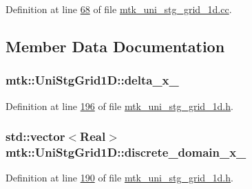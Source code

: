 Definition at line \hyperlink{mtk__uni__stg__grid__1d_8cc_source_l00068}{68} of file \hyperlink{mtk__uni__stg__grid__1d_8cc_source}{mtk\+\_\+uni\+\_\+stg\+\_\+grid\+\_\+1d.\+cc}.



\subsection{Member Data Documentation}
\hypertarget{classmtk_1_1UniStgGrid1D_a12577bbe0b88e9a0ac9b2267f2fcc48c}{
\subsubsection[{delta\+\_\+x\+\_\+}]{ mtk\+::\+Uni\+Stg\+Grid1\+D\+::delta\+\_\+x\+\_\+\hspace{0.3cm}{\ttfamily [private]}}}\label{classmtk_1_1UniStgGrid1D_a12577bbe0b88e9a0ac9b2267f2fcc48c}


Definition at line \hyperlink{mtk__uni__stg__grid__1d_8h_source_l00196}{196} of file \hyperlink{mtk__uni__stg__grid__1d_8h_source}{mtk\+\_\+uni\+\_\+stg\+\_\+grid\+\_\+1d.\+h}.

\hypertarget{classmtk_1_1UniStgGrid1D_a0a1f9c00e21659e05f414dd97e2a52e3}{
\subsubsection[{discrete\+\_\+domain\+\_\+x\+\_\+}]{\setlength{\rightskip}{0pt plus 5cm}std\+::vector$<${\bf Real}$>$ mtk\+::\+Uni\+Stg\+Grid1\+D\+::discrete\+\_\+domain\+\_\+x\+\_\+\hspace{0.3cm}{\ttfamily [private]}}}\label{classmtk_1_1UniStgGrid1D_a0a1f9c00e21659e05f414dd97e2a52e3}


Definition at line \hyperlink{mtk__uni__stg__grid__1d_8h_source_l00190}{190} of file \hyperlink{mtk__uni__stg__grid__1d_8h_source}{mtk\+\_\+uni\+\_\+stg\+\_\+grid\+\_\+1d.\+h}.

